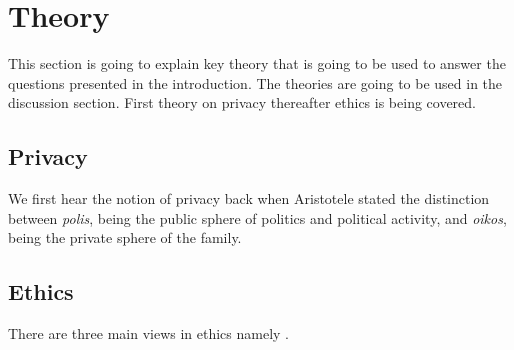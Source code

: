 \section{Theory}
This section is going to explain key theory that is going to be used to answer the questions presented in the introduction. The theories are going to be used in the discussion section. First theory on privacy thereafter ethics is being covered. 

\subsection{Privacy}
We first hear the notion of privacy back when Aristotele stated the distinction between \textit{polis}, being the public sphere of politics and political activity, and \textit{oikos}, being the private sphere of the family. 

\subsection{Ethics}
There are three main views in ethics namely .  
